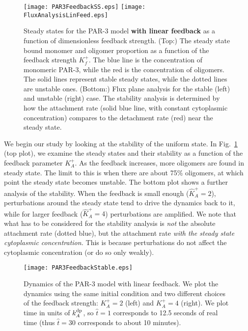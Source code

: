 \documentclass[11pt]{article}
\newcommand{\6}[1]{#1_{\text{6}}}
\newcommand{\3}[1]{#1_{\text{3}}}
\begin{document}
\begin{figure}
\centering
\texttt{[image: PAR3FeedbackSS.eps]}
\texttt{[image: FluxAnalysisLinFeed.eps]}
\caption{\label{fig:PAR3FeedSS}Steady states for the PAR-3 model \textbf{with linear feedback} as a function of dimensionless feedback strength. (Top:) The steady state bound monomer and oligomer proportion as a function of the feedback strength $K_f^+$. The blue line is the concentration of monomeric PAR-3, while the red is the concentration of oligomers. The solid lines represent stable steady states, while the dotted lines are unstable ones. (Bottom:) Flux plane analysis for the stable (left) and unstable (right) case. The stability analysis is determined by how the attachment rate (solid blue line, with constant cytoplasmic concentration) compares to the detachment rate (red) near the steady state.}
\end{figure}

We begin our study by looking at the stability of the uniform state. In Fig.\ \ref{fig:PAR3FeedSS} (top plot), we examine the steady states and their stability as a function of the feedback parameter $K_A^+$. As the feedback increases, more oligomers are found in steady state. The limit to this is when there are about 75\% oligomers, at which point the steady state becomes unstable. The bottom plot shows a further analysis of the stability. When the feedback is small enough ($\hat K_A^+=2$), perturbations around the steady state tend to drive the dynamics back to it, while for larger feedback ($\hat K_A^+=4$) perturbations are amplified. We note that what has to be considered for the stability analysis is \emph{not} the absolute attachment rate (dotted blue), but the attachment rate \emph{with the steady state cytoplasmic concentration.} This is because perturbations do not affect the cytoplasmic concentration (or do so only weakly).


\begin{figure}
\centering
\texttt{[image: PAR3FeedbackStable.eps]}
\caption{\label{fig:PAR3Dyn}Dynamics of the PAR-3 model with linear feedback. We plot the dynamics using the same initial condition and two different choices of the feedback strength: $K_A^+=2$ (left) and $K_A^+=4$ (right). We plot time in units of $k^\text{dp}_A$, so $\hat t =1$ corresponds to 12.5 seconds of real time (thus $\hat t = 30$ corresponds to about 10 minutes).}
\end{figure}
\end{document}
